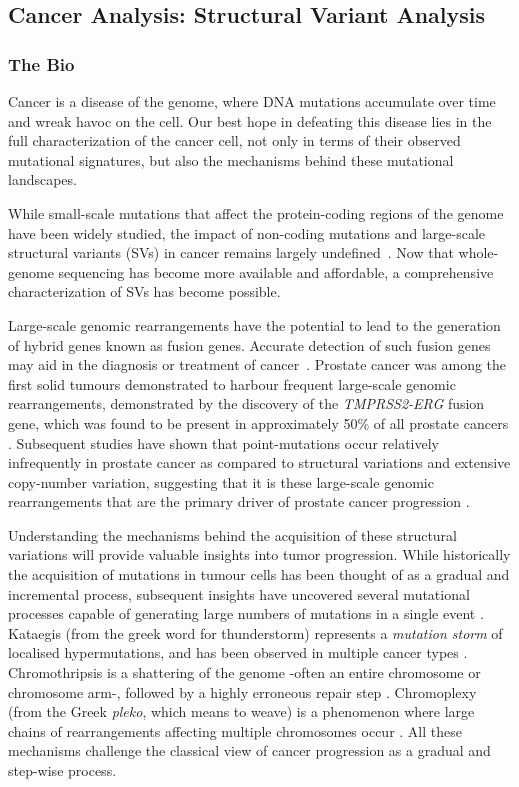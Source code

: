 \subsection{Cancer Analysis: Structural Variant Analysis}
\subsubsection{The Bio}

Cancer is a disease of the genome, where DNA mutations accumulate over time and wreak havoc on the cell. Our best hope in defeating this disease lies in the full characterization of the cancer cell, not only in terms of their observed mutational signatures, but also the mechanisms behind these mutational landscapes.

While small-scale mutations that affect the protein-coding regions of the genome have been widely studied, the impact of non-coding mutations and large-scale structural variants (SVs) in cancer remains largely undefined~\cite{cuykendall2017non,khurana2016role}. Now that whole-genome sequencing has become more available and affordable, a comprehensive characterization of SVs has become possible.

Large-scale genomic rearrangements have the potential to lead to the generation of hybrid genes known as fusion genes.
Accurate detection of such fusion genes may aid in the diagnosis or treatment of cancer~\cite{nowell1960chromosome,nowell1961chromosome,druker2001activity,druker2001efficacy}.
Prostate cancer was among the first solid tumours demonstrated to harbour frequent large-scale genomic rearrangements, demonstrated by the discovery of the \emph{TMPRSS2-ERG} fusion gene, which was found to be present in approximately 50\% of all prostate cancers \cite{tomlins2005recurrent}.
Subsequent studies have shown that point-mutations occur relatively infrequently in prostate cancer as compared to structural variations and extensive copy-number variation, suggesting that it is these large-scale genomic rearrangements that are the primary driver of prostate cancer progression \cite{taylor2010integrative,rubin2011common}.

Understanding the mechanisms behind the acquisition of these structural variations will provide valuable insights into tumor progression.
While historically the acquisition of mutations in tumour cells has been thought of as a gradual and incremental process, subsequent insights have uncovered several mutational processes capable of generating large numbers of mutations in a single event \cite{cortes2020comprehensive,willis2015}.
Kataegis (from the greek word for thunderstorm) represents a \emph{mutation storm} of localised hypermutations, and has been observed in multiple cancer types \cite{nik2012mutational,davis2014somatic}.
Chromothripsis is a shattering of the genome -often an entire chromosome or chromosome arm-, followed by a highly erroneous repair step \cite{stephens2011massive,maher2012chromothripsis}.
Chromoplexy (from the Greek \emph{pleko}, which means to weave) is a phenomenon where large chains of rearrangements affecting multiple chromosomes occur \cite{shen2013chromoplexy}. All these mechanisms challenge the classical view of cancer progression as a gradual and step-wise process.

